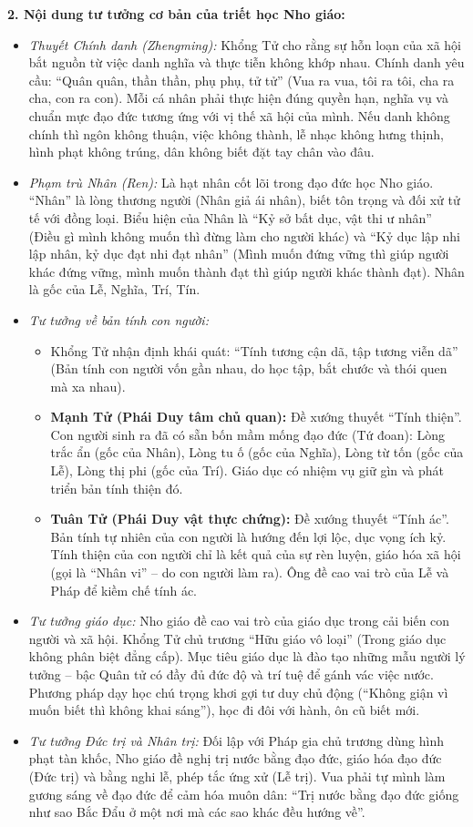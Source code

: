 \documentclass[12pt,a4paper]{article}
\begin{document}
\noindent
\textbf{2. Nội dung tư tưởng cơ bản của triết học Nho giáo:}
\begin{itemize}
    \item \textit{Thuyết Chính danh (Zhengming):} Khổng Tử cho rằng sự hỗn loạn của xã hội bắt nguồn từ việc danh nghĩa và thực tiễn không khớp nhau. Chính danh yêu cầu: ``Quân quân, thần thần, phụ phụ, tử tử'' (Vua ra vua, tôi ra tôi, cha ra cha, con ra con). Mỗi cá nhân phải thực hiện đúng quyền hạn, nghĩa vụ và chuẩn mực đạo đức tương ứng với vị thế xã hội của mình. Nếu danh không chính thì ngôn không thuận, việc không thành, lễ nhạc không hưng thịnh, hình phạt không trúng, dân không biết đặt tay chân vào đâu.
    \item \textit{Phạm trù Nhân (Ren):} Là hạt nhân cốt lõi trong đạo đức học Nho giáo. ``Nhân'' là lòng thương người (Nhân giả ái nhân), biết tôn trọng và đối xử tử tế với đồng loại. Biểu hiện của Nhân là ``Kỷ sở bất dục, vật thi ư nhân'' (Điều gì mình không muốn thì đừng làm cho người khác) và ``Kỷ dục lập nhi lập nhân, kỷ dục đạt nhi đạt nhân'' (Mình muốn đứng vững thì giúp người khác đứng vững, mình muốn thành đạt thì giúp người khác thành đạt). Nhân là gốc của Lễ, Nghĩa, Trí, Tín.
    \item \textit{Tư tưởng về bản tính con người:}
    \begin{itemize}
        \item Khổng Tử nhận định khái quát: ``Tính tương cận dã, tập tương viễn dã'' (Bản tính con người vốn gần nhau, do học tập, bắt chước và thói quen mà xa nhau).
        \item \textbf{Mạnh Tử (Phái Duy tâm chủ quan):} Đề xướng thuyết ``Tính thiện''. Con người sinh ra đã có sẵn bốn mầm mống đạo đức (Tứ đoan): Lòng trắc ẩn (gốc của Nhân), Lòng tu ố (gốc của Nghĩa), Lòng từ tốn (gốc của Lễ), Lòng thị phi (gốc của Trí). Giáo dục có nhiệm vụ giữ gìn và phát triển bản tính thiện đó.
        \item \textbf{Tuân Tử (Phái Duy vật thực chứng):} Đề xướng thuyết ``Tính ác''. Bản tính tự nhiên của con người là hướng đến lợi lộc, dục vọng ích kỷ. Tính thiện của con người chỉ là kết quả của sự rèn luyện, giáo hóa xã hội (gọi là ``Nhân vi'' -- do con người làm ra). Ông đề cao vai trò của Lễ và Pháp để kiềm chế tính ác.
    \end{itemize}
    \item \textit{Tư tưởng giáo dục:} Nho giáo đề cao vai trò của giáo dục trong cải biến con người và xã hội. Khổng Tử chủ trương ``Hữu giáo vô loại'' (Trong giáo dục không phân biệt đẳng cấp). Mục tiêu giáo dục là đào tạo những mẫu người lý tưởng -- bậc Quân tử có đầy đủ đức độ và trí tuệ để gánh vác việc nước. Phương pháp dạy học chú trọng khơi gợi tư duy chủ động (``Không giận vì muốn biết thì không khai sáng''), học đi đôi với hành, ôn cũ biết mới.
    \item \textit{Tư tưởng Đức trị và Nhân trị:} Đối lập với Pháp gia chủ trương dùng hình phạt tàn khốc, Nho giáo đề nghị trị nước bằng đạo đức, giáo hóa đạo đức (Đức trị) và bằng nghi lễ, phép tắc ứng xử (Lễ trị). Vua phải tự mình làm gương sáng về đạo đức để cảm hóa muôn dân: ``Trị nước bằng đạo đức giống như sao Bắc Đẩu ở một nơi mà các sao khác đều hướng về''.
\end{itemize}
\end{document}
